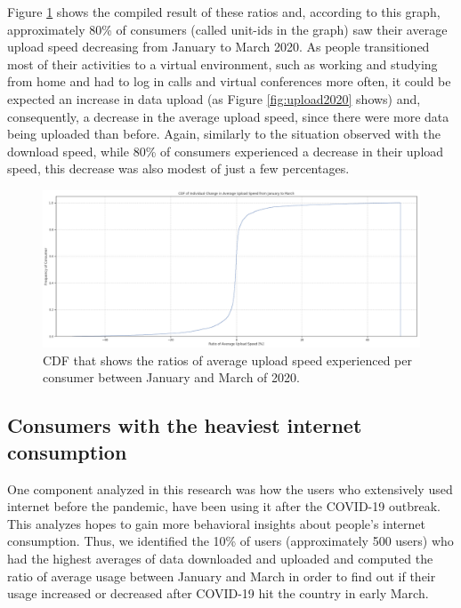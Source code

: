 \documentclass[conference,10pt]{IEEEtran}
\begin{document}
Figure \ref{fig:uploadspeed2020} shows the compiled result of these ratios and, according to this graph, approximately 80\% of consumers (called unit-ids in the graph) saw their average upload speed decreasing from January to March 2020. As people transitioned most of their activities to a virtual environment, such as working and studying from home and had to log in calls and virtual conferences more often, it could be expected an increase in data upload (as Figure \ref{fig:upload2020} shows) and, consequently, a decrease in the average upload speed, since there were more data being uploaded than before. Again, similarly to the situation observed with the download speed, while 80\% of consumers experienced a decrease in their upload speed, this decrease was also modest of just a few percentages.

\begin{figure}
\centering
\includegraphics[width=1.0\linewidth]{figs/uploadspeed.PNG}
\caption{CDF that shows the ratios of average upload speed experienced per consumer between January and March of 2020.}
\label{fig:uploadspeed2020}
\end{figure}

\subsection{Consumers with the heaviest internet consumption}
\label{sec:analyzing-the-users-with-the-highest-internet-usage}

One component analyzed in this research was how the users who extensively used internet before the pandemic, have been using it after the COVID-19 outbreak. This analyzes hopes to gain more behavioral insights about people's internet consumption. Thus, we identified the 10\% of users (approximately 500 users) who had the highest averages of data downloaded and uploaded and computed the ratio of average usage between January and March in order to find out if their usage increased or decreased after COVID-19 hit the country in early March.
\end{document}
